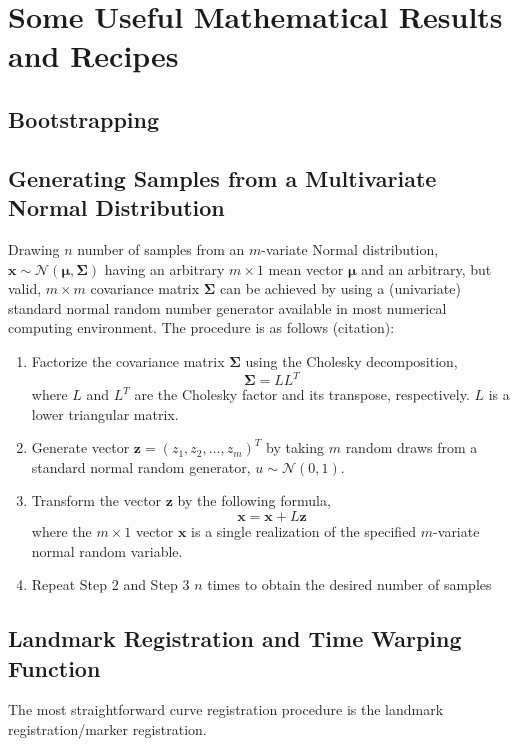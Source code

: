 \chapter{Some Useful Mathematical Results and Recipes}\label{app:math_results}

\section{Bootstrapping}

\section{Generating Samples from a Multivariate Normal Distribution}

Drawing $n$ number of samples from an $m$-variate Normal distribution, $\boldsymbol{x} \sim \mathcal{N}(\boldsymbol{\mu}, \boldsymbol{\Sigma})$ having an arbitrary $m \times 1$ mean vector $\boldsymbol{\mu}$ and an arbitrary, but valid, $m \times m$ covariance matrix $\boldsymbol{\Sigma}$ can be achieved by using a (univariate) standard normal random number generator available in most numerical computing environment.
The procedure is as follows (citation):

\begin{enumerate}
	\item Factorize the covariance matrix $\boldsymbol{\Sigma}$ using the Cholesky decomposition,
	\begin{equation}
	\boldsymbol{\Sigma} = L L^T
	\end{equation}
	where $L$ and $L^T$ are the Cholesky factor and its transpose, respectively. $L$ is a lower triangular matrix.
	
	\item Generate vector $\mathbf{z}=(z_1, z_2, \dots, z_m)^T$ by taking $m$ random draws from a standard normal random generator, $u \sim \mathcal{N}(0, 1)$.
	
	\item Transform the vector $\mathbf{z}$ by the following formula,
	\begin{equation}
	\mathbf{x} = \boldsymbol{x} + L \boldsymbol{z}
	\end{equation}
	where the $m \times 1$ vector $\mathbf{x}$ is a single realization of the specified $m$-variate normal random variable.
	
	\item Repeat Step $2$ and Step $3$ $n$ times to obtain the desired number of samples 
\end{enumerate}

\section{Landmark Registration and Time Warping Function}\label{app:landmark}

The most straightforward curve registration procedure is the landmark registration/marker registration.